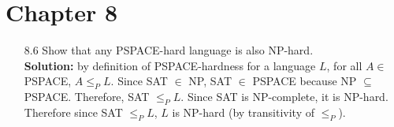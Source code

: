 \chapter*{Chapter 8}

\begin{enumerate}

\item[8.6]Show that any PSPACE-hard language is also NP-hard.
\\
\textbf{Solution:} by definition of PSPACE-hardness for a language $L$, for all $A \in$ PSPACE, $A \le_P L$. Since SAT $\in$ NP, SAT $\in$ PSPACE because NP $\subseteq$ PSPACE. Therefore, SAT $\le_P L$. Since SAT is NP-complete, it is NP-hard. Therefore since SAT $\le_P L$, $L$ is NP-hard (by transitivity of $\le_P$).

\end{enumerate}